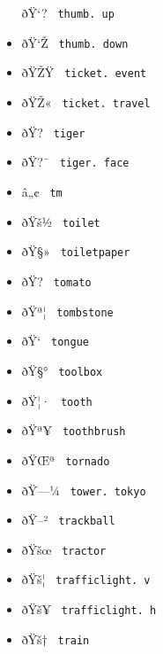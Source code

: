 \begin{itemize}
  \label{symbol-thumb.up}{{ ðŸ`? }
  \texttt{\ thumb.\ up\ }}
\item
  \label{symbol-thumb.down}{{ ðŸ`Ž }
  \texttt{\ thumb.\ down\ }}
\item
  \label{symbol-ticket.event}{{ ðŸŽŸ }
  \texttt{\ ticket.\ event\ }}
\item
  \label{symbol-ticket.travel}{{ ðŸŽ« }
  \texttt{\ ticket.\ travel\ }}
\item
  \label{symbol-tiger}{{ ðŸ? } \texttt{\ tiger\ }}
\item
  \label{symbol-tiger.face}{{ ðŸ?¯ }
  \texttt{\ tiger.\ face\ }}
\item
  \label{symbol-tm}{{ â„¢ } \texttt{\ tm\ }}
\item
  \label{symbol-toilet}{{ ðŸš½ } \texttt{\ toilet\ }}
\item
  \label{symbol-toiletpaper}{{ ðŸ§» }
  \texttt{\ toiletpaper\ }}
\item
  \label{symbol-tomato}{{ ðŸ? } \texttt{\ tomato\ }}
\item
  \label{symbol-tombstone}{{ ðŸª¦ }
  \texttt{\ tombstone\ }}
\item
  \label{symbol-tongue}{{ ðŸ` } \texttt{\ tongue\ }}
\item
  \label{symbol-toolbox}{{ ðŸ§° } \texttt{\ toolbox\ }}
\item
  \label{symbol-tooth}{{ ðŸ¦· } \texttt{\ tooth\ }}
\item
  \label{symbol-toothbrush}{{ ðŸª¥ }
  \texttt{\ toothbrush\ }}
\item
  \label{symbol-tornado}{{ ðŸŒª } \texttt{\ tornado\ }}
\item
  \label{symbol-tower.tokyo}{{ ðŸ---¼ }
  \texttt{\ tower.\ tokyo\ }}
\item
  \label{symbol-trackball}{{ ðŸ--² }
  \texttt{\ trackball\ }}
\item
  \label{symbol-tractor}{{ ðŸšœ } \texttt{\ tractor\ }}
\item
  \label{symbol-trafficlight.v}{{ ðŸš¦ }
  \texttt{\ trafficlight.\ v\ }}
\item
  \label{symbol-trafficlight.h}{{ ðŸš¥ }
  \texttt{\ trafficlight.\ h\ }}
\item
  \label{symbol-train}{{ ðŸš† } \texttt{\ train\ }}

\end{itemize}
